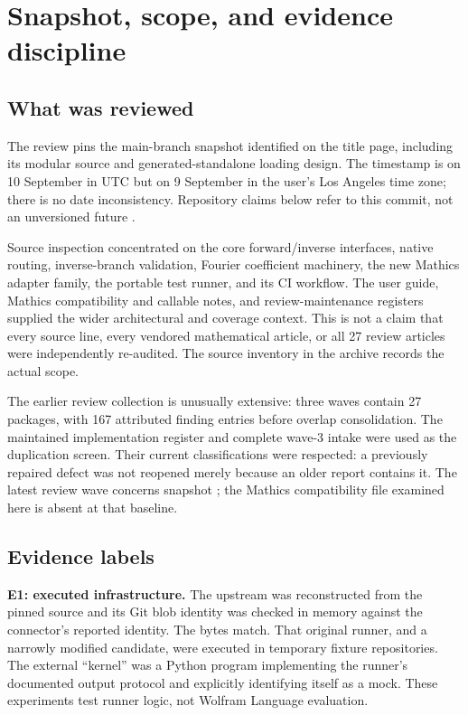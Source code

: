 \documentclass[11pt,a4paper]{article}
\newcommand{\code}[1]{\texttt{\detokenize{#1}}}
\newcommand{\ev}[1]{\textbf{#1}}
\begin{document}
\section{Snapshot, scope, and evidence discipline}

\subsection{What was reviewed}

The review pins the main-branch snapshot identified on the title page, including
its modular source and generated-standalone loading design. The timestamp is on
10 September in UTC but on 9 September in the user's Los Angeles time zone;
there is no date inconsistency. Repository claims below refer to this commit,
not an unversioned future \code{main}. \cite{commit,modulemap}

Source inspection concentrated on the core forward/inverse interfaces, native
routing, inverse-branch validation, Fourier coefficient machinery, the new
Mathics adapter family, the portable test runner, and its CI workflow. The user
guide, Mathics compatibility and callable notes, and review-maintenance
registers supplied the wider architectural and coverage context. This is not a
claim that every source line, every vendored mathematical article, or all 27
review articles were independently re-audited. The source inventory in the
archive records the actual scope.

The earlier review collection is unusually extensive: three waves contain 27
packages, with 167 attributed finding entries before overlap consolidation.
The maintained implementation register and complete wave-3 intake were used as
the duplication screen. Their current classifications were respected: a
previously repaired defect was not reopened merely because an older report
contains it. The latest review wave concerns snapshot \code{6687962}; the
Mathics compatibility file examined here is absent at that baseline.
\cite{reviewindex,status,intake}

\subsection{Evidence labels}

\ev{E1: executed infrastructure.} The upstream
 was reconstructed from the pinned source
and its Git blob identity was checked in memory against the connector's reported
identity. The bytes match. That original runner, and a narrowly modified
candidate, were executed in temporary fixture repositories. The external
``kernel'' was a Python program implementing the runner's documented output
protocol and explicitly identifying itself as a mock. These experiments test
runner logic, not Wolfram Language evaluation.
\end{document}
